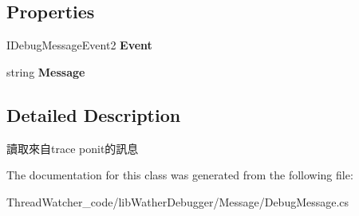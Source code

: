 \subsection*{Properties}
\begin{DoxyCompactItemize}
\item 
\hypertarget{classlib_wather_debugger_1_1_message_1_1_debug_message_a7ce0bde60fc04fa6f7e2d62029cbda13}{I\+Debug\+Message\+Event2 {\bfseries Event}}\label{classlib_wather_debugger_1_1_message_1_1_debug_message_a7ce0bde60fc04fa6f7e2d62029cbda13}

\item 
\hypertarget{classlib_wather_debugger_1_1_message_1_1_debug_message_a405aa56547da9164d932ab8c35712549}{string {\bfseries Message}}\label{classlib_wather_debugger_1_1_message_1_1_debug_message_a405aa56547da9164d932ab8c35712549}

\end{DoxyCompactItemize}


\subsection{Detailed Description}
讀取來自trace ponit的訊息 



The documentation for this class was generated from the following file\+:\begin{DoxyCompactItemize}
\item 
Thread\+Watcher\+\_\+code/lib\+Wather\+Debugger/\+Message/Debug\+Message.\+cs\end{DoxyCompactItemize}
